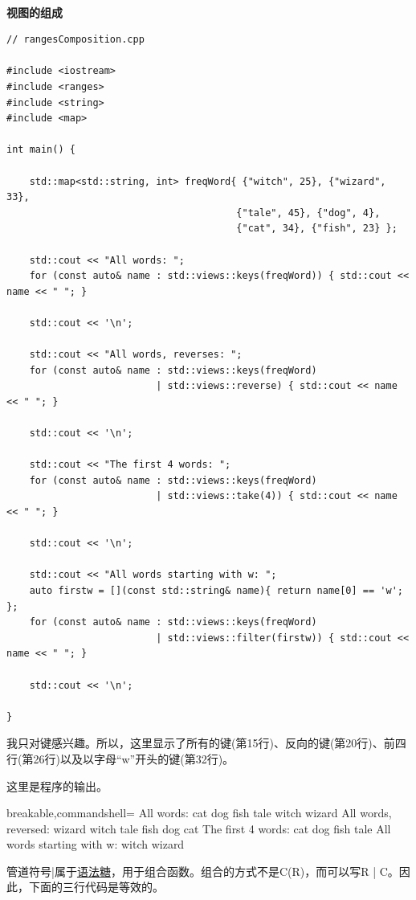 \hspace*{\fill} \\ %
\noindent
\textbf{视图的组成}
\begin{lstlisting}[style=styleCXX]
// rangesComposition.cpp

#include <iostream>
#include <ranges>
#include <string>
#include <map>

int main() {
	
	std::map<std::string, int> freqWord{ {"witch", 25}, {"wizard", 33},
										{"tale", 45}, {"dog", 4},
										{"cat", 34}, {"fish", 23} };
	
	std::cout << "All words: ";
	for (const auto& name : std::views::keys(freqWord)) { std::cout << name << " "; }
	
	std::cout << '\n';
	
	std::cout << "All words, reverses: ";
	for (const auto& name : std::views::keys(freqWord)
	                      | std::views::reverse) { std::cout << name << " "; }
	
	std::cout << '\n';
	
	std::cout << "The first 4 words: ";
	for (const auto& name : std::views::keys(freqWord)
	                      | std::views::take(4)) { std::cout << name << " "; }
	
	std::cout << '\n';
	
	std::cout << "All words starting with w: ";
	auto firstw = [](const std::string& name){ return name[0] == 'w'; };
	for (const auto& name : std::views::keys(freqWord)
	                      | std::views::filter(firstw)) { std::cout << name << " "; }
	
	std::cout << '\n';

}
\end{lstlisting}

我只对键感兴趣。所以，这里显示了所有的键(第15行)、反向的键(第20行)、前四行(第26行)以及以字母“w”开头的键(第32行)。

这里是程序的输出。

\begin{tcblisting}{breakable,commandshell={}}
All words: cat dog fish tale witch wizard
All words, reversed: wizard witch tale fish dog cat
The first 4 words: cat dog fish tale
All words starting with w: witch wizard
\end{tcblisting}

管道符号|属于\href{https://en.wikipedia.org/wiki/Syntactic_sugar}{语法糖}，用于组合函数。组合的方式不是C(R)，而可以写R | C。因此，下面的三行代码是等效的。

